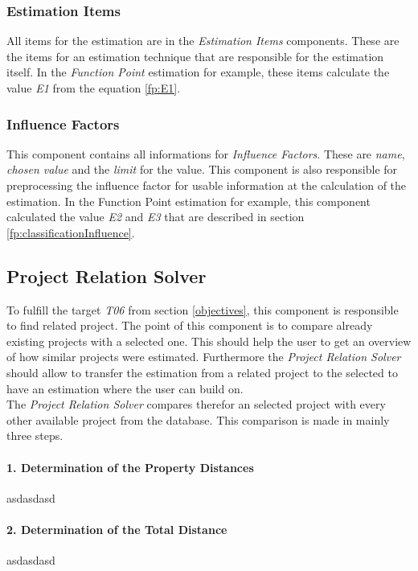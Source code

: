 \subsubsection{Estimation Items}

All items for the estimation are in the \textit{Estimation Items} components. These are the items for an estimation technique that are responsible for the estimation itself. In the \textit{Function Point} estimation for example, these items calculate the value \textit{E1} from the equation \ref{fp:E1}.\\

\subsubsection{Influence Factors}

This component contains all informations for \textit{Influence Factors}. These are \textit{name}, \textit{chosen value} and the \textit{limit} for the value. This component is also responsible for preprocessing the influence factor for usable information at the calculation of the estimation. In the Function Point estimation for example, this component calculated the value \textit{E2} and \textit{E3} that are described in section \ref{fp:classificationInfluence}.\\

\subsection{Project Relation Solver}\label{projectRealtionSolver}

To fulfill the target \textit{T06} from section \ref{objectives}, this component is responsible to find related project. The point of this component is to compare already existing projects with a selected one. This should help the user to get an overview of how similar projects were estimated. Furthermore the \textit{Project Relation Solver} should allow to transfer the estimation from a related project to the selected to have an estimation where the user can build on.\\
The \textit{Project Relation Solver} compares therefor an selected project with every other available project from the database. This comparison is made in mainly three steps.
\paragraph*{1. Determination of the Property Distances}
asdasdasd
\paragraph*{2. Determination of the Total Distance}
asdasdasd
